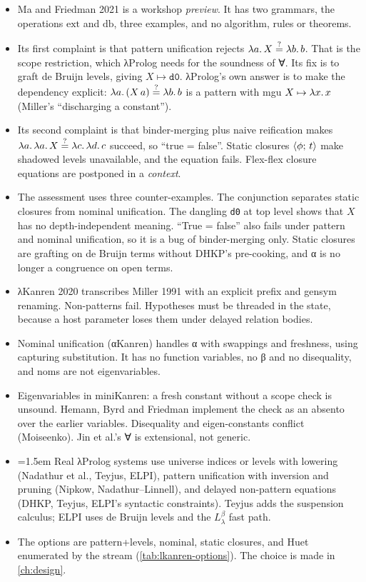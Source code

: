 \begin{itemize}
  \item Ma and Friedman 2021 \cite{MaFriedman2021} is a workshop \emph{preview}. It has two grammars,
    the operations $\mathrm{ext}$ and $\mathrm{db}$, three examples, and no algorithm, rules or
    theorems.
  \item Its first complaint is that pattern unification rejects $\lambda a.\,X\stackrel{?}{=}\lambda b.\,b$. That is
    the scope restriction, which λProlog needs for the soundness of ∀. Its fix is to graft de Bruijn
    levels, giving $X\mapsto\texttt{d0}$. λProlog's own answer is to make the dependency explicit:
    $\lambda a.\,(X\,a)\stackrel{?}{=}\lambda b.\,b$ is a pattern with mgu $X\mapsto\lambda x.\,x$ (Miller's
    \enquote{discharging a constant}).
  \item Its second complaint is that binder-merging plus naive reification makes
    $\lambda a.\,\lambda a.\,X\stackrel{?}{=}\lambda c.\,\lambda d.\,c$ succeed, so \enquote{true = false}. Static closures
    $\langle \phi;\,t\rangle$ make shadowed levels unavailable, and the equation fails. Flex-flex closure
    equations are postponed in a \emph{context}.
  \item The assessment uses three counter-examples. The conjunction separates static closures from
    nominal unification. The dangling \texttt{d0} at top level shows that $X$ has no
    depth-independent meaning. \enquote{True = false} also fails under pattern and nominal
    unification, so it is a bug of binder-merging only. Static closures are grafting on de Bruijn
    terms without DHKP's pre-cooking, and α is no longer a congruence on open terms.
  \item λKanren 2020 transcribes Miller 1991 with an explicit prefix and gensym renaming. Non-patterns
    fail. Hypotheses must be threaded in the state, because a host parameter loses them under delayed
    relation bodies.
  \item Nominal unification (αKanren) handles α with swappings and freshness, using capturing
    substitution. It has no function variables, no β and no disequality, and noms are not
    eigenvariables.
  \item Eigenvariables in miniKanren: a fresh constant without a scope check is unsound. Hemann, Byrd
    and Friedman implement the check as an absento over the earlier variables. Disequality and
    eigen-constants conflict (Moiseenko). Jin et al.'s ∀ is extensional, not generic.
  \item\begingroup\emergencystretch=1.5em Real λProlog systems use universe indices or levels with lowering (Nadathur et al., Teyjus,
    ELPI), pattern unification with inversion and pruning (Nipkow, Nadathur--\allowbreak Linnell), and delayed
    non-pattern equations (DHKP, Teyjus, ELPI's syntactic constraints). Teyjus adds the suspension
    calculus; ELPI uses de Bruijn levels and the $L^\beta_\lambda$ fast path.\par\endgroup
  \item The options are pattern+levels, nominal, static closures, and Huet enumerated by the stream
    (\cref{tab:lkanren-options}). The choice is made in \cref{ch:design}.
\end{itemize}
